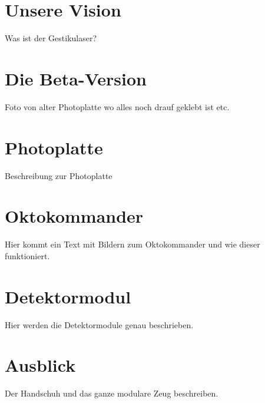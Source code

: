 \documentclass{sciposter}
\begin{document}
\begin{multicols}{3}
\setlength{\parindent}{2em}

\section{Unsere Vision}
Was ist der Gestikulaser? 

\section{Die Beta-Version}
Foto von alter Photoplatte wo alles noch drauf geklebt ist etc.

\section{Photoplatte}
Beschreibung zur Photoplatte \\


\section{Oktokommander}
Hier kommt ein Text mit Bildern zum Oktokommander und wie dieser funktioniert.

\section{Detektormodul}
Hier werden die Detektormodule genau beschrieben.

\section{Ausblick}
Der Handschuh und das ganze modulare Zeug beschreiben.

\end{multicols}
\end{document}
